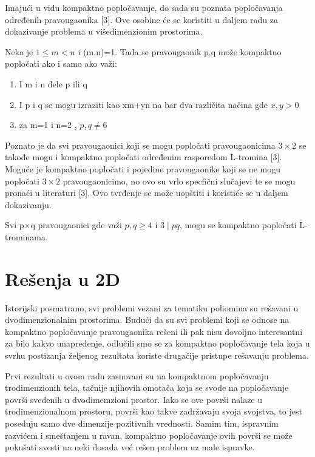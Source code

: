 Imajući u vidu kompaktno popločavanje, do sada su poznata popločavanja određenih pravougaonika [3]. Ove osobine će se koristiti u daljem radu za dokazivanje problema u višedimenzionim prostorima.  

\begin{Theorem}
    Neka je $1\leq m<n $ i (m,n)=1. Tada se pravougaonik p,q može kompaktno popločati ako i samo ako važi:
    \begin{enumerate}
        \item I m i n dele p ili q
        \item I p i q se mogu izraziti kao xm+yn na bar dva različita načina gde $x,y>0$
        \item za m=1 i n=2 , $p,q\neq6$
    \end{enumerate}
\end{Theorem}

Poznato je da svi pravougaonici koji se mogu popločati pravougaonicima $3\times2$ se takođe mogu i kompaktno popločati određenim rasporedom L-tromina [3]. Moguće je kompaktno popločati i pojedine pravougaonike koji se ne mogu popločati $3\times2$ pravougaonicimo, no ovo su vrlo specfični slučajevi te se mogu pronaći u literaturi [3]. Ovo tvrđenje se može uopštiti  i koristiće se u daljem dokazivanju.

\begin{Theorem}
    Svi p×q pravougaonici gde važi $p,q \geq 4$ i $3\mid pq$, mogu se kompaktno popločati L-trominama.
\end{Theorem}


\section{Rešenja u 2D}

Istorijski posmatrano, svi problemi vezani za tematiku poliomina  su rešavani u dvodimenzionalnim prostorima. Budući da su svi problemi koji se odnose na kompaktno popločavanje pravougaonika rešeni ili pak nisu dovoljno interesantni za bilo kakvo unapređenje, odlučili smo se za kompaktno popločavanje tela koja u svrhu postizanja željenog rezultata koriste drugačije pristupe rešavanju problema. 

Prvi rezultati u ovom radu zasnovani su na kompaktnom popločavanju trodimenzionih tela, tačnije njihovih omotača koja se svode na popločavanje površi svedenih u dvodimemzioni prostor. Iako se ove površi nalaze u trodimenzionalnom prostoru, površi kao takve zadržavaju svoja svojstva, to jest poseduju samo dve dimenzije pozitivnih vrednosti. Samim tim, ispravnim razvićem i smeštanjem u ravan, kompaktno popločavanje ovih površi se može pokušati svesti na neki dosada već rešen problem uz male ispravke.

